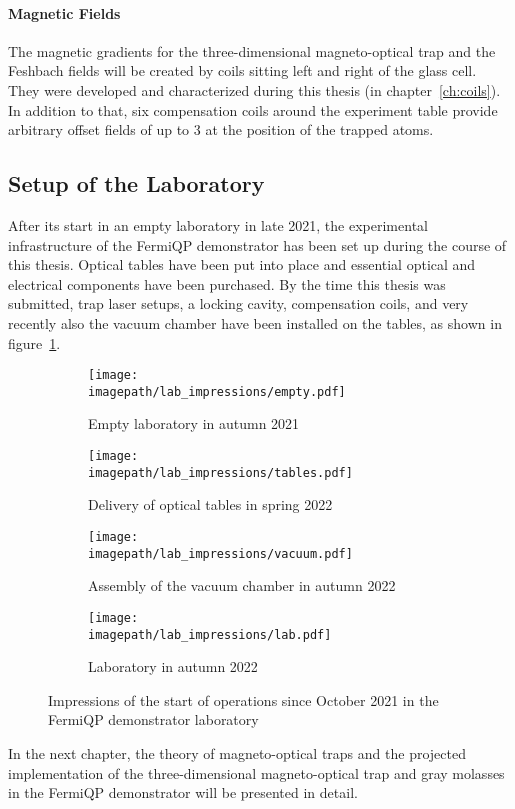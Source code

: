 \paragraph{Magnetic Fields}
The magnetic gradients for the three-dimensional magneto-optical trap and the Fesh\-bach fields will be created by coils sitting left and right of the glass cell. They were developed and characterized during this thesis (in chapter~\ref{ch:coils}). In addition to that, six compensation coils around the experiment table provide arbitrary offset fields of up to \SI[]{3}{\gauss} at the position of the trapped atoms.

\subsection*{Setup of the Laboratory}
After its start in an empty laboratory in late 2021, the experimental infrastructure of the FermiQP demonstrator has been set up during the course of this thesis. Optical tables have been put into place and essential optical and electrical components have been purchased. By the time this thesis was submitted, trap laser setups, a locking cavity, compensation coils, and very recently also the vacuum chamber have been installed on the tables, as shown in figure~\ref{fig:lab_impressions}.

\begin{figure}[h]
    \centering
    \begin{subfigure}[t]{0.48\textwidth}
        \centering
        \texttt{[image: \\imagepath/lab\_impressions/empty.pdf]}
        \caption{Empty laboratory in autumn 2021}
    \end{subfigure}
    \hspace{0.03\textwidth}
    \begin{subfigure}[t]{0.48\textwidth}
        \centering
        \texttt{[image: \\imagepath/lab\_impressions/tables.pdf]}
        \caption{Delivery of optical tables in spring 2022}
    \end{subfigure}

    \vspace{0.03\textwidth}
    \begin{subfigure}[t]{0.345\textwidth}
        \centering
        \texttt{[image: \\imagepath/lab\_impressions/vacuum.pdf]}
        \caption{Assembly of the vacuum chamber in autumn 2022}
    \end{subfigure}
    \hspace{0.03\textwidth}
    \begin{subfigure}[t]{0.61\textwidth}
        \centering
        \texttt{[image: \\imagepath/lab\_impressions/lab.pdf]}
        \caption{Laboratory in autumn 2022}
    \end{subfigure}
    \caption{Impressions of the start of operations since October 2021 in the FermiQP demonstrator laboratory}
    \label{fig:lab_impressions}
\end{figure}

\null

In the next chapter, the theory of magneto-optical traps and the projected implementation of the three-dimensional magneto-optical trap and gray molasses in the FermiQP demonstrator will be presented in detail.